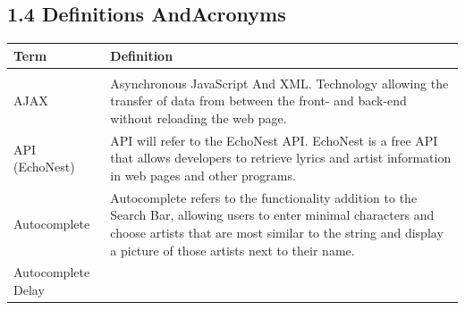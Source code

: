 \documentclass[]{article}
\begin{document}
\subsection{\textbf{1.4 Definitions AndAcronyms}}\label{definitions-and-acronyms}

\begin{longtable}[c]{@{}ll@{}}
\toprule\addlinespace
\begin{minipage}[t]{0.47\columnwidth}\raggedright
Term
\end{minipage} & \begin{minipage}[t]{0.47\columnwidth}\raggedright
Definition
\end{minipage}
\\
\hline
\\\addlinespace
\begin{minipage}[t]{0.47\columnwidth}\raggedright
AJAX
\end{minipage} & \begin{minipage}[t]{0.47\columnwidth}\raggedright
Asynchronous JavaScript And XML. Technology allowing the transfer of
data from between the front- and back-end without reloading the web
page.
\end{minipage}
\\\addlinespace
\begin{minipage}[t]{0.47\columnwidth}\raggedright
API (EchoNest)
\end{minipage} & \begin{minipage}[t]{0.47\columnwidth}\raggedright
API will refer to the EchoNest API. EchoNest is a free API that allows
developers to retrieve lyrics and artist information in web pages and
other programs.
\end{minipage}
\\\addlinespace
\begin{minipage}[t]{0.47\columnwidth}\raggedright
Autocomplete
\end{minipage} & \begin{minipage}[t]{0.47\columnwidth}\raggedright
Autocomplete refers to the functionality addition to the Search Bar,
allowing users to enter minimal characters and choose artists that are
most similar to the string and display a picture of those artists next
to their name.
\end{minipage}
\\\addlinespace
\begin{minipage}[t]{0.47\columnwidth}\raggedright
Autocomplete Delay
\end{minipage} & \begin{minipage}[t]{0.47\columnwidth}\raggedright

\end{minipage}
\end{longtable}
\end{document}
